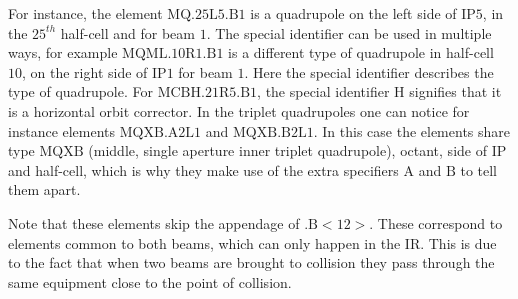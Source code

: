 For instance, the element \(\mathrm{MQ.25L5.B1}\) is a quadrupole on the left side of \(\mathrm{IP5}\), in the \(25^{th}\) half-cell and for beam \(1\).
The special identifier can be used in multiple ways, for example \(\mathrm{MQML.10R1.B1}\) is a different type of quadrupole in half-cell \(10\), on the right side of \(\mathrm{IP1}\) for beam \(1\).
Here the special identifier describes the type of quadrupole.
For \(\mathrm{MCBH.21R5.B1}\), the special identifier \(\mathrm{H}\) signifies that it is a horizontal orbit corrector.
In the triplet quadrupoles one can notice for instance elements \(\mathrm{MQXB.A2L1}\) and \(\mathrm{MQXB.B2L1}\).
In this case the elements share type \(\mathrm{MQXB}\) (middle, single aperture inner triplet quadrupole), octant, side of \(\mathrm{IP}\) and half-cell, which is why they make use of the extra specifiers \(\mathrm{A}\) and \(\mathrm{B}\) to tell them apart.

Note that these elements skip the appendage of \(\mathrm{.B<12>}\).
These correspond to elements common to both beams, which can only happen in the \(\mathrm{IR}\).
This is due to the fact that when two beams are brought to collision they pass through the same equipment close to the point of collision.

